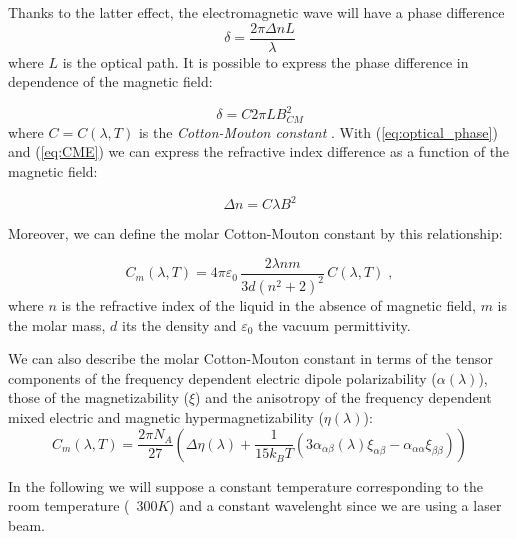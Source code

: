 \documentclass[11pt,a4paper]{article}
\begin{document}
Thanks to the latter effect, the electromagnetic wave will have a phase difference
\begin{equation}\label{eq:optical_phase}
\delta=\frac{2\pi \Delta n L}{\lambda}
\end{equation}
where $L$ is the optical path. It is possible to express the phase difference in dependence of the magnetic field:

\begin{equation}\label{eq:CME}
\delta=C2\pi L B_{CM}^2
\end{equation}
where $C=C(\lambda,T)$ is the \emph{Cotton-Mouton constant} \cite{wilson1997simple}. With (\ref{eq:optical_phase}) and (\ref{eq:CME}) we can express the refractive index difference as a function of the magnetic field:

\begin{equation}\label{eq:Delta_n}
\Delta n=C\lambda B^2
\end{equation}

Moreover, we can define the molar Cotton-Mouton constant by this relationship:

\begin{equation}\label{eq:molar_CM}
C_m(\lambda, T)=4\pi\varepsilon_0\,\frac{2\lambda nm}{3d(n^2+2)^2}\,C(\lambda,T)\;,
\end{equation}
where $n$ is the refractive index of the liquid in the absence of magnetic field, $m$ is the molar mass, $d$ its the density and $\varepsilon_0$ the vacuum permittivity.

We can also describe the molar Cotton-Mouton constant in terms of the tensor components of the frequency dependent electric dipole polarizability ($\alpha(\lambda)$), those of the magnetizability ($\xi$) and the anisotropy of the frequency dependent mixed electric and magnetic hypermagnetizability ($\eta(\lambda)$):
\begin{equation}
C_m(\lambda, T)=\frac{2\pi N_A}{27}(\Delta\eta(\lambda)+\frac{1}{15k_BT}(3\alpha_{\alpha\beta}(\lambda)\xi_{\alpha\beta}-\alpha_{\alpha\alpha}\xi_{\beta\beta}))
\end{equation}

In the following we will suppose a constant temperature corresponding to the room temperature (~$300K$) and a constant wavelenght since we are using a laser beam.
\end{document}
